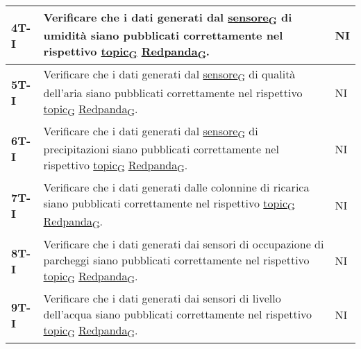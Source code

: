 \begin{longtable}{|>{\raggedright\arraybackslash}m{}|>{\raggedright\arraybackslash}m{}|>{\raggedright\arraybackslash}m{}|}
	\hline
	\textbf{4T-I}   & Verificare che i dati generati dal \href{https://7last.github.io/docs/rtb/documentazione-interna/glossario\#sensore}{sensore\textsubscript{G}} di umidità siano pubblicati correttamente nel rispettivo \href{https://7last.github.io/docs/rtb/documentazione-interna/glossario\#topic}{topic\textsubscript{G}} \href{https://7last.github.io/docs/rtb/documentazione-interna/glossario\#redpanda}{Redpanda\textsubscript{G}}.                  & NI             \\
	\hline
	\textbf{5T-I}   & Verificare che i dati generati dal \href{https://7last.github.io/docs/rtb/documentazione-interna/glossario\#sensore}{sensore\textsubscript{G}} di qualità dell'aria siano pubblicati correttamente nel rispettivo \href{https://7last.github.io/docs/rtb/documentazione-interna/glossario\#topic}{topic\textsubscript{G}} \href{https://7last.github.io/docs/rtb/documentazione-interna/glossario\#redpanda}{Redpanda\textsubscript{G}}.        & NI             \\
	\hline
	\textbf{6T-I}   & Verificare che i dati generati dal \href{https://7last.github.io/docs/rtb/documentazione-interna/glossario\#sensore}{sensore\textsubscript{G}} di precipitazioni siano pubblicati correttamente nel rispettivo \href{https://7last.github.io/docs/rtb/documentazione-interna/glossario\#topic}{topic\textsubscript{G}} \href{https://7last.github.io/docs/rtb/documentazione-interna/glossario\#redpanda}{Redpanda\textsubscript{G}}.           & NI             \\
	\hline
	\textbf{7T-I}   & Verificare che i dati generati dalle colonnine di ricarica siano pubblicati correttamente nel rispettivo \href{https://7last.github.io/docs/rtb/documentazione-interna/glossario\#topic}{topic\textsubscript{G}} \href{https://7last.github.io/docs/rtb/documentazione-interna/glossario\#redpanda}{Redpanda\textsubscript{G}}.             & NI             \\
	\hline
	\textbf{8T-I}   & Verificare che i dati generati dai sensori di occupazione di parcheggi siano pubblicati correttamente nel rispettivo \href{https://7last.github.io/docs/rtb/documentazione-interna/glossario\#topic}{topic\textsubscript{G}} \href{https://7last.github.io/docs/rtb/documentazione-interna/glossario\#redpanda}{Redpanda\textsubscript{G}}. & NI             \\
	\hline
	\textbf{9T-I}   & Verificare che i dati generati dai sensori di livello dell'acqua siano pubblicati correttamente nel rispettivo \href{https://7last.github.io/docs/rtb/documentazione-interna/glossario\#topic}{topic\textsubscript{G}} \href{https://7last.github.io/docs/rtb/documentazione-interna/glossario\#redpanda}{Redpanda\textsubscript{G}}.       & NI             \\

\end{longtable}
